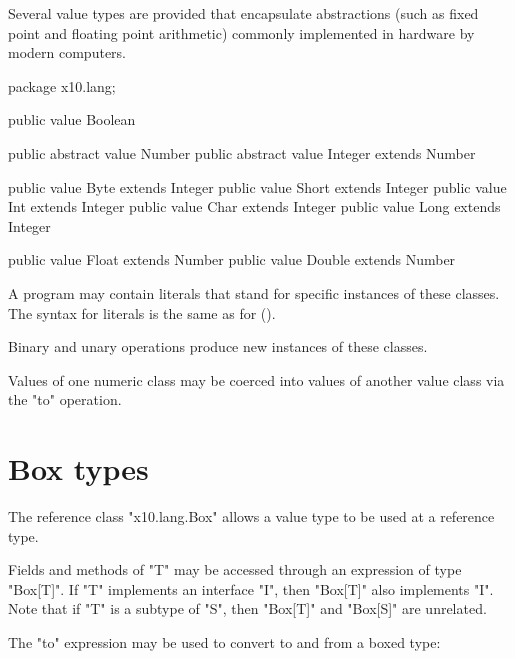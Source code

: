 Several value types are provided that encapsulate
abstractions (such as fixed point and floating point arithmetic)
commonly implemented in hardware by modern computers.

\begin{xten}
package x10.lang;

public value Boolean { }

public abstract value Number { }
public abstract value Integer extends Number { }

public value Byte extends Integer  { }
public value Short extends Integer { }
public value Int extends Integer   { }
public value Char extends Integer  { }
public value Long extends Integer  { }

public value Float extends Number  { }
public value Double extends Number { }
\end{xten}

A program may contain literals
that stand for specific instances of these classes. The syntax
for literals is the same as for \java{} ().

Binary and unary operations produce new instances of these
classes.

Values of one numeric class may be coerced into values of
another value class via the \xcd"to" operation.





\section{Box types}
\label{BoxType}

The reference class \xcd"x10.lang.Box" allows a value type to be used at a
reference type.

Fields and methods of \xcd"T" may be accessed through an
expression of type \xcd"Box[T]".
If \xcd"T" implements an interface \xcd"I", then
\xcd"Box[T]" also implements \xcd"I". 
Note that if \xcd"T" is a subtype of \xcd"S",
then \xcd"Box[T]" and \xcd"Box[S]" are unrelated.


The \xcd"to" expression may be used to convert to and from a
boxed type:


